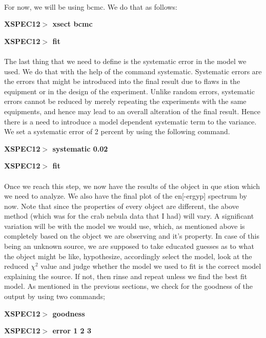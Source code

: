 \documentclass[a4paper,twoside]{report}
\numberwithin{equation}{section}
\begin{document}
\paragraph{}
For now, we will be using bcmc. We do that as follows:
\begin{center}
\item \large \textbf{XSPEC12$>$ xsect bcmc}
\item \large \textbf{XSPEC12$>$ fit}
\end{center}
\paragraph{}
The last thing that we need to define is the systematic error in the model we used. We do that with the help of the command systematic. Systematic errors are the errors that might be introduced into the final result due to flaws in the equipment or in the design of the experiment. Unlike random errors, systematic errors cannot be reduced by merely repeating the experiments with the same equipments, and hence may lead to an overall alteration of the final result. Hence there is a need to introduce a model dependent systematic term to the variance. We set a systematic error of 2 percent by using the following command. 
\begin{center}
\item \large \textbf{XSPEC12$>$ systematic 0.02}
\item \large \textbf{XSPEC12$>$ fit}
\end{center}
\paragraph{}
Once we reach this step, we now have the results of the object in que
\;stion which we need to analyze. We also have the final plot of the en[-ergyp] spectrum by now. Note that since the properties of every object are different, the above method (which was for the crab nebula data that I had) will vary. A significant variation will be with the model we would use, which, as mentioned above is completely based on the object we are observing and it's property. In case of this being an unknown source, we are supposed to take educated guesses as to what the object might be like, hypothesize, accordingly select the model, look at the reduced $\chi ^2$ value and judge whether the model we used to fit is the correct model explaining the source. If not, then rinse and repeat unless we find the best fit model. As mentioned in the previous sections, we check for the goodness of the output by using two commands;
\begin{center}
\item \large \textbf{XSPEC12$>$ goodness}
\item \large \textbf{XSPEC12$>$ error 1 2 3}
\end{center}
\end{document}
